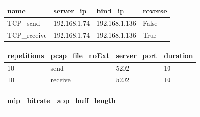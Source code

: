 



\begin{table}[htbp]
\centering
\begin{tabularx}{\textwidth}{|X|X|X|X|}
\hline
\textbf{name} & \textbf{server\_ip} & \textbf{bind\_ip} & \textbf{reverse} \\
\hline
TCP\_send & 192.168.1.74 & 192.168.1.136 & False \\
TCP\_receive & 192.168.1.74 & 192.168.1.136 & True \\
\hline
\end{tabularx}
\end{table}

\begin{table}[htbp]
\centering
\begin{tabularx}{\textwidth}{|X|X|X|X|}
\hline
\textbf{repetitions} & \textbf{pcap\_file\_noExt} & \textbf{server\_port} & \textbf{duration} \\
\hline
10 & send & 5202 & 10 \\
10 & receive & 5202 & 10 \\
\hline
\end{tabularx}
\end{table}


\begin{table}[htbp]
\centering
\begin{tabularx}{\textwidth}{|X|X|X|}
\hline
\textbf{udp} & \textbf{bitrate} & \textbf{app\_buff\_length} \\
\hline
 &  & \\
 &  & \\
\hline
\end{tabularx}
\end{table}
